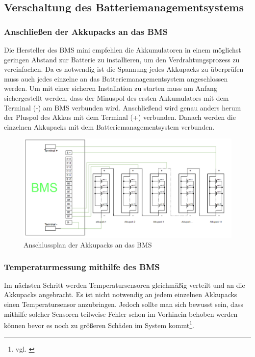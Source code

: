 \subsection{Verschaltung des Batteriemanagementsystems}

\subsubsection{Anschließen der Akkupacks an das BMS}

Die Hersteller des BMS mini empfehlen die Akkumulatoren in einem möglichst geringen Abstand zur Batterie zu installieren, um den Verdrahtungsprozess zu vereinfachen. Da es notwendig ist die Spannung jedes Akkupacks zu überprüfen muss auch jedes einzelne an das Batteriemanagementsystem angeschlossen werden. Um mit einer sicheren Installation zu starten muss am Anfang sichergestellt werden, dass der Minuspol des ersten Akkumulators mit dem Terminal (-) am BMS verbunden wird. Anschließend wird genau anders herum der Pluspol des Akkus mit dem Terminal (+) verbunden. Danach werden die einzelnen Akkupacks mit dem Batteriemanagementsystem verbunden.

\begin{figure}[H]
	\begin{center}
		\includegraphics[angle=90,scale=0.65]{figures/Akku/BMSAkkupacks.PNG}
		\caption{Anschlussplan der Akkupacks an das BMS}
		\label{fig: Anschlussplan der Akkupacks an das BMS}
	\end{center}
\end{figure}

\newpage
\subsubsection{Temperaturmessung mithilfe des BMS}

Im nächsten Schritt werden Temperatursensoren gleichmäßig verteilt und an die Akkupacks angebracht. Es ist nicht notwendig an jedem einzelnen Akkupacks einen Temperatursensor anzubringen. Jedoch sollte man sich bewusst sein, dass mithilfe solcher Sensoren teilweise Fehler schon im Vorhinein behoben werden können bevor es noch zu größeren Schäden im System kommt\footnote{vgl. \cite{Tempmess}}.


